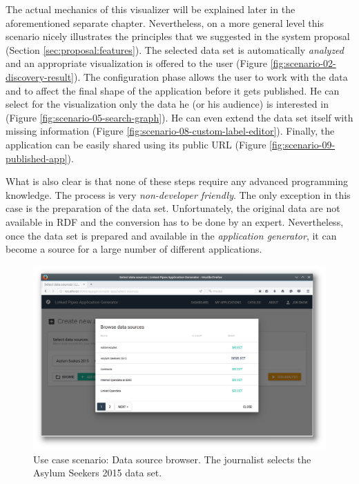 The actual mechanics of this visualizer will be explained later in the aforementioned separate chapter. Nevertheless, on a more general level this scenario nicely illustrates the principles that we suggested in the system proposal (Section \ref{sec:proposal:features}). The selected data set is automatically \emph{analyzed} and an appropriate visualization is offered to the user (Figure \ref{fig:scenario-02-discovery-result}). The configuration phase allows the user to work with the data and to affect the final shape of the application before it gets published. He can select for the visualization only the data he (or his audience) is interested in (Figure \ref{fig:scenario-05-search-graph}). He can even extend the data set itself with missing information (Figure \ref{fig:scenario-08-custom-label-editor}). Finally, the application can be easily shared using its public URL (Figure \ref{fig:scenario-09-published-app}).

What is also clear is that none of these steps require any advanced programming knowledge. The process is very \emph{non-developer friendly}. The only exception in this case is the preparation of the data set. Unfortunately, the original data are not available in RDF and the conversion has to be done by an expert. Nevertheless, once the data set is prepared and available in the \emph{application generator}, it can become a source for a large number of different applications.

\begin{figure}
	\centering
	\includegraphics[width=145mm]{img/05_scenario_01_browse_data_sources.png}
	\caption{Use case scenario: Data source browser. The journalist selects the Asylum Seekers 2015 data set.}
	\label{fig:scenario-01-browse-data-sources}
\end{figure}

